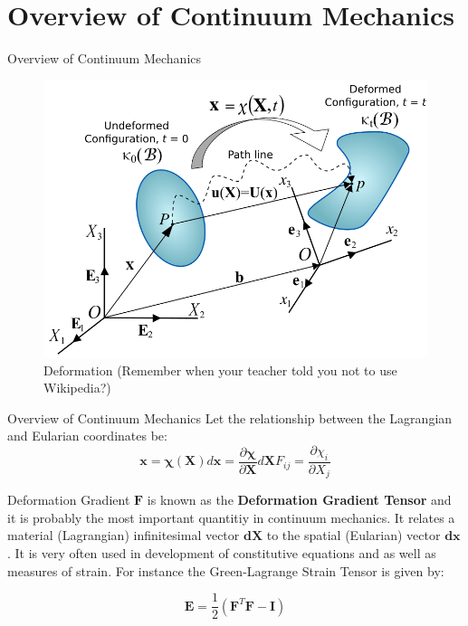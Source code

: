 \documentclass{beamer}
\begin{document}
\section{Overview of Continuum Mechanics}
\begin{frame}{Overview of Continuum Mechanics}
	\begin{figure}
		\includegraphics[scale=0.25]{Deform}
		\caption{Deformation (Remember when your teacher told you not to use Wikipedia?)}
	\end{figure}
	
\end{frame}
\begin{frame}{Overview of Continuum Mechanics}
	Let the relationship between the Lagrangian and Eularian coordinates be:
	\begin{subequations}
		\begin{equation}\label{eq:phi}		
			\bm{x}=\bm{\chi}(\bm{X})
		\end{equation}
		\begin{equation}
			d\bm{x}=\frac{\partial \bm{\chi}}{\partial\bm{X}}d\bm{X}
		\end{equation}
		\begin{equation}
			F_{ij}=\frac{\partial \chi_{i}}{\partial X_{j}}
		\end{equation}
	\end{subequations}
\begin{block}{Deformation Gradient}
$\bm{F}$ is known as the \textbf{Deformation Gradient Tensor} and it is probably the most important quantitiy in
continuum mechanics. It relates a material (Lagrangian) infinitesimal vector $\bm{dX}$ to the spatial (Eularian) 
vector $\bm{dx}$. It is very often used in development of constitutive equations and as well as measures of strain. 
For instance the Green-Lagrange Strain Tensor is given by:
\end{block}
\begin{equation}
	\bm{E}=\frac{1}{2}(\bm{F}^{T}\bm{F}-\bm{I})
\end{equation}
\end{frame}
\end{document}
